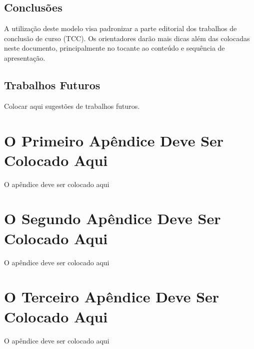 \documentclass[
        oneside,      %
        english,			
        brazil			 
        ]{configcefetmglpd}
\begin{document}
\section{Conclusões}
A utilização deste modelo visa padronizar a parte editorial dos trabalhos de conclusão de curso (TCC). Os orientadores darão mais dicas além das colocadas neste documento, principalmente no tocante ao conteúdo e sequência de apresentação.

\section{Trabalhos Futuros}
Colocar aqui sugestões de trabalhos futuros.


\postextual 





\begin{apendices}

\chapter{\apendseq O Primeiro Apêndice Deve Ser Colocado Aqui} 

O apêndice deve ser colocado aqui


\chapter{\apendseq O Segundo Apêndice Deve Ser Colocado Aqui} 

O apêndice deve ser colocado aqui 


\chapter{\apendseq O Terceiro Apêndice Deve Ser Colocado Aqui} 

O apêndice deve ser colocado aqui 


\end{apendices}
\end{document}
